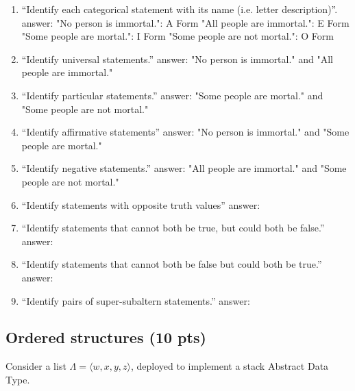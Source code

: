 \documentclass[12pt]{article}
\begin{document}
\begin{enumerate}
\item  ``Identify each categorical statement with its name (i.e. letter description)''.
\subitem answer:
\subitem "No person is immortal.": A Form
\subitem "All people are immortal.": E Form
\subitem "Some people are mortal.": I Form
\subitem "Some people are not mortal.": O Form 

\item ``Identify universal statements.''
\subitem answer: 
\subitem "No person is immortal." and "All people are immortal."

\item ``Identify particular statements.''
\subitem answer:
\subitem "Some people are mortal." and "Some people are not mortal."

\item ``Identify affirmative statements''
\subitem answer:
\subitem "No person is immortal." and "Some people are mortal."

\item ``Identify negative statements.''
\subitem answer: 
\subitem "All people are immortal." and "Some people are not mortal."

\item ``Identify statements with opposite truth values''
\subitem answer:  

\item ``Identify statements that cannot both be true, but could both be false.''
\subitem answer:  

\item ``Identify statements that cannot both be false but could both be true.''
\subitem answer:  

\item ``Identify pairs of super-subaltern statements.''
\subitem answer:  

\end{enumerate}


\newpage

\subsection{Ordered structures (10 pts)}

Consider a list $\Lambda = \langle w, x, y, z \rangle$, deployed to implement a stack Abstract Data Type.
\end{document}
